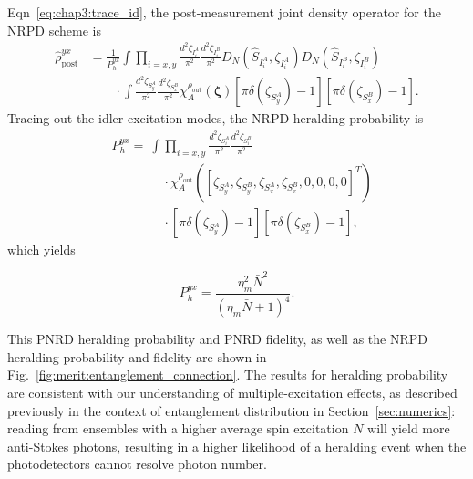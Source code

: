 \documentclass[aps,twocolumn,secnumarabic,amsmath,amssymb,pra,groupedaddress,
showpacs, showkeys]{revtex4-1}
\newcommand{\pna}[1]{\left(#1\right)}
\newcommand{\pnb}[1]{\left[#1\right]}
\newcommand{\eqn}[1]{
\begin{equation}
	#1
\end{equation}
}
\begin{document}
Eqn~\ref{eq:chap3:trace_id}, the post-measurement joint density operator for
the NRPD scheme is
\begin{align}
\hat{\rho}_{\textrm{post}}^{yx}& =
\frac{1}{P_{h}^{yx}}\int \prod_{i=x,y}
\frac{d^2 \zeta_{I_i^A}}{\pi^2} 
\frac{d^2 \zeta_{I_i^B}}{\pi^2} 
D_N\pna{\hat{S}_{I_i^A},\zeta_{I_i^A}} 
D_N\pna{\hat{S}_{I_i^B},\zeta_{I_i^B}}  \nonumber \\
& \qquad \cdot \int 
\frac{d^2 \zeta_{S_y^A}}{\pi^2} 
\frac{d^2 \zeta_{S_x^B}}{\pi^2}
\chi_A^{\rho_{\textrm{out}}}\pna{\bm{\zeta}} 
\pnb{\pi\delta\pna{\zeta_{S_y^A}}-1}\pnb{\pi\delta\pna{\zeta_{S_x^B}}-1}.
\end{align}
Tracing out the idler excitation modes, the NRPD heralding probability is 
\begin{align}
& P_{h}^{yx} = \nonumber \ \int 
\prod_{i=x,y}
\frac{d^2 \zeta_{S_i^A}}{\pi^2} 
\frac{d^2 \zeta_{S_i^B}}{\pi^2} \nonumber \\ 
& \qquad \qquad \cdot
\chi_A^{\rho_{\textrm{out}}}\pna{\pnb{\zeta_{S_y^A},\zeta_{S_y^B},\zeta_{S_x^A},\zeta_{S_x^B},0,0,0,0}^T}
\nonumber \\
& \qquad \qquad \cdot 
\pnb{\pi\delta\pna{\zeta_{S_y^A}}-1}\pnb{\pi\delta\pna{\zeta_{S_x^B}}-1},
\end{align}
which yields
\eqn{
P_{h}^{yx} = \frac{\eta ^2_{m} \bar{N}^2}{(\eta_{m}  \bar{N}+1)^4}.
}
This PNRD heralding probability and PNRD fidelity, as well as the NRPD
heralding probability and fidelity are shown in
Fig.~\ref{fig:merit:entanglement_connection}. The results for heralding
probability are consistent with our understanding of multiple-excitation
effects, as described previously in the context of entanglement distribution in
Section~\ref{sec:numerics}: reading from ensembles with a higher average spin
excitation $\bar{N}$ will yield more anti-Stokes photons, resulting in a higher
likelihood of a heralding event when the photodetectors cannot resolve photon
number.
\end{document}
